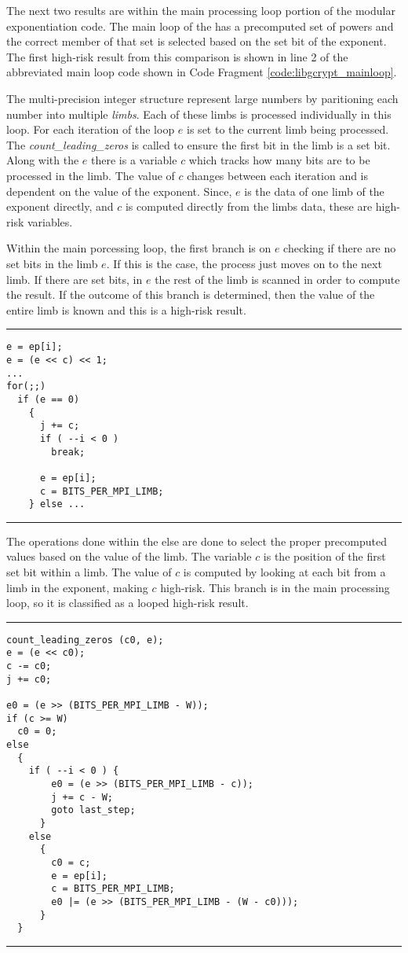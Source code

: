 \documentclass[11pt,a4paper]{article}
\begin{document}
The next two results are within the main processing loop portion of the modular
exponentiation code. The main loop of the has a precomputed set of powers and
the correct member of that set is selected based on the set bit of the exponent.
The first high-risk result from this comparison is shown in line 2 of the
abbreviated main loop code shown in Code Fragment \ref{code:libgcrypt_mainloop}.

The multi-precision integer structure represent large numbers by paritioning
each number into multiple \textit{limbs}. Each of these limbs is
processed individually in this loop. For each iteration of the loop $e$ is set
to the current limb being processed. The \textit{count\_leading\_zeros}
is called to ensure the first bit in the limb is a set bit. Along with the $e$
there is a variable $c$ which tracks how many bits are to be processed in the
limb. The value of $c$ changes between each iteration and is dependent on the
value of the exponent. Since, $e$ is the data of one limb of the exponent
directly, and $c$ is computed directly from the limbs data, these are high-risk
variables.

Within the main porcessing loop, the first branch is on $e$ checking if there
are no set bits in the limb $e$. If this is the case, the process just moves on to the
next limb. If there are set bits, in $e$ the rest of the limb is scanned in
order to compute the result. If the outcome of this branch is determined, then
the value of the entire limb is known and this is a high-risk result.

\vspace{5pt}
\hrule
\begin{lstlisting}[caption=Libgcrypt lines 609-626, label=code:libgcrypt_mainloop]
e = ep[i];
e = (e << c) << 1;
...
for(;;)
  if (e == 0)
    {
      j += c;
      if ( --i < 0 )
        break;

      e = ep[i];
      c = BITS_PER_MPI_LIMB;
    } else ...
\end{lstlisting}
\hrule
\vspace{5pt}


The operations done within the else are done to select the proper precomputed
values based on the value of the limb. The variable $c$ is the position of the
first set bit within a limb.  The value of $c$ is computed by looking
at each bit from a limb in the exponent, making $c$ high-risk. This
branch is in the main processing loop, so it is classified as a looped high-risk result.


\vspace{5pt}
\hrule
\begin{lstlisting}[caption=Libgcrypt lines 635-658]
count_leading_zeros (c0, e);
e = (e << c0);
c -= c0;
j += c0;

e0 = (e >> (BITS_PER_MPI_LIMB - W));
if (c >= W)
  c0 = 0;
else
  {
    if ( --i < 0 ) {
        e0 = (e >> (BITS_PER_MPI_LIMB - c));
        j += c - W;
        goto last_step;
      }
    else
      {
        c0 = c;
        e = ep[i];
        c = BITS_PER_MPI_LIMB;
        e0 |= (e >> (BITS_PER_MPI_LIMB - (W - c0)));
      }
  }
\end{lstlisting}
\hrule
\vspace{5pt}
\end{document}
